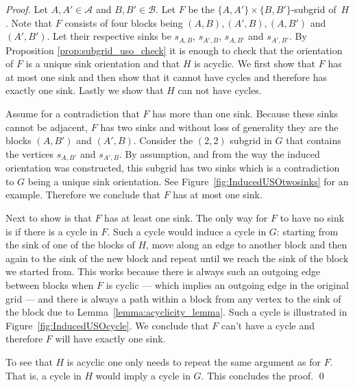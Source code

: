 \documentclass[runningheads,a4paper]{llncs}
\newcommand{\A}{\ensuremath{\mathcal A}}
\newcommand{\B}{\ensuremath{\mathcal B}}
\newcommand{\s}[1]{\ensuremath{s_{\scriptscriptstyle#1}}}
\begin{document}
\begin{proof}
Let $A, A'\in \A$ and $B,B'\in \B$. Let $F$ be the $\{A,A'\}\times\{B, B'\}$-subgrid of~$H$.
Note that $F$ consists of four blocks being $(A,B), (A', B), (A, B')$ and $(A', B')$. Let their respective sinks be $s_{A,B}$, $s_{A',B}$, $s_{A,B'}$ and $s_{A',B'}$.
By Proposition \ref{prop:subgrid_uso_check} it is enough to check that the orientation of $F$ is a unique sink orientation and that $H$ is acyclic.
We first show that $F$ has at most one sink and then show that it cannot have cycles and therefore has exactly one sink. Lastly we show that $H$ can not have cycles.

Assume for a contradiction that $F$ has more than one sink.
Because these sinks cannot be adjacent, $F$ has two sinks and without loss of generality they are the blocks $(A,B')$ and $(A', B)$. Consider the $(2,2)$ subgrid in $G$ that contains the vertices $\s{A,B'}$ and $\s{A',B}$. By assumption, and from the way the induced orientation was constructed, this subgrid has two sinks which is a contradiction to $G$ being a unique sink orientation. See Figure~\ref{fig:InducedUSOtwosinks} for an example. Therefore we conclude that $F$ has at most one sink. 

Next to show is that $F$ has at least one sink. The only way for $F$ to have no sink is if there is a cycle in $F$. Such a cycle would induce a cycle in $G$: starting from the sink of one of the blocks of $H$, move along an edge to another block and then again to the sink of the new block and repeat until we reach the sink of the block we started from. This works because there is always such an outgoing edge between blocks when $F$ is cyclic --- which implies an outgoing edge in the original grid --- and there is always a path within a block from any vertex to the sink of the block due to Lemma~\ref{lemma:acyclicity_lemma}. Such a cycle is illustrated in Figure~\ref{fig:InducedUSOcycle}. We conclude that $F$ can't have a cycle and therefore $F$ will have exactly one sink.

To see that $H$ is acyclic one only needs to repeat the same argument as for $F$. That is, a cycle in $H$ would imply a cycle in $G$. This concludes the proof. \qed


\end{proof}
\end{document}
